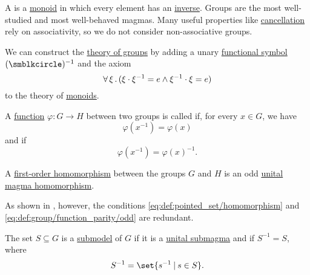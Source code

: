 \begin{definition}\label{def:group}
  A  is a \hyperref[def:unital_magma/monoid]{monoid} in which every element has an \hyperref[def:unital_magma_inverse_element]{inverse}. Groups are the most well-studied and most well-behaved magmas. Many useful properties like \hyperref[thm:def:group/properties/cancellative]{cancellation} rely on associativity, so we do not consider non-associative groups.

  \begin{thmenum}
     We can construct the \hyperref[def:first_order_theory]{theory of groups} by adding a unary \hyperref[def:first_order_language/func]{functional symbol} \( (\anon)^{-1} \) and the axiom
    \begin{equation}\label{eq:def:group/theory/inverse_axiom}
      \forall \thinspace \xi \thinspace . \thinspace (\xi \cdot \xi^{-1} = e \wedge \xi^{-1} \cdot \xi = e)
    \end{equation}
    to the theory of \hyperref[def:unital_magma/monoid]{monoids}.

     A \hyperref[def:function]{function} \( \varphi: G \to H \) between two groups is called  if, for every \( x \in G \), we have
    \begin{equation}\label{eq:def:group/function_parity/even}
      \varphi(x^{-1}) = \varphi(x)
    \end{equation}
    and  if
    \begin{equation}\label{eq:def:group/function_parity/odd}
      \varphi(x^{-1}) = \varphi(x)^{-1}.
    \end{equation}

     A \hyperref[def:first_order_homomorphism]{first-order homomorphism} between the groups \( G \) and \( H \) is an odd \hyperref[def:unital_magma/homomorphism]{unital magma homomorphism}.

    As shown in , however, the conditions \eqref{eq:def:pointed_set/homomorphism} and \eqref{eq:def:group/function_parity/odd} are redundant.

     The set \( S \subseteq G \) is a \hyperref[thm:substructure_is_model]{submodel} of \( G \) if it is a \hyperref[def:unital_magma/submodel]{unital submagma} and if \( S^{-1} = S \), where
    \begin{equation*}
      S^{-1} = \set{ s^{-1} \given s \in S }.
    \end{equation*}


\end{thmenum}
\end{definition}
